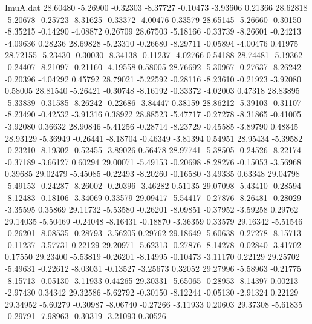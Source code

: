 \begin{filecontents}{ImuA.dat}
  28.60480   -5.26900   -0.32303   -8.37727   -0.10473   -3.93606    0.21366
  28.62818   -5.20678   -0.25723   -8.31625   -0.33372   -4.00476    0.33579
  28.65145   -5.26660   -0.30150   -8.35215   -0.14290   -4.08872    0.26709
  28.67503   -5.18166   -0.33739   -8.26601   -0.24213   -4.09636    0.28236
  28.69828   -5.23310   -0.26680   -8.29711   -0.05894   -4.00476    0.41975
  28.72155   -5.23430   -0.30030   -8.34138   -0.11237   -4.02766    0.54188
  28.74481   -5.19362   -0.24407   -8.21097   -0.21160   -4.19558    0.58005
  28.76692   -5.30967   -0.27637   -8.26242   -0.20396   -4.04292    0.45792
  28.79021   -5.22592   -0.28116   -8.23610   -0.21923   -3.92080    0.58005
  28.81540   -5.26421   -0.30748   -8.16192   -0.33372   -4.02003    0.47318
  28.83895   -5.33839   -0.31585   -8.26242   -0.22686   -3.84447    0.38159
  28.86212   -5.39103   -0.31107   -8.23490   -0.42532   -3.91316    0.38922
  28.88523   -5.47717   -0.27278   -8.31865   -0.41005   -3.92080    0.36632
  28.90846   -5.41256   -0.28714   -8.23729   -0.45585   -3.89790    0.48845
  28.93129   -5.36949   -0.26441   -8.18704   -0.46349   -3.81394    0.54951
  28.95434   -5.39582   -0.23210   -8.19302   -0.52455   -3.89026    0.56478
  28.97741   -5.38505   -0.24526   -8.22174   -0.37189   -3.66127    0.60294
  29.00071   -5.49153   -0.20698   -8.28276   -0.15053   -3.56968    0.39685
  29.02479   -5.45085   -0.22493   -8.20260   -0.16580   -3.49335    0.63348
  29.04798   -5.49153   -0.24287   -8.26002   -0.20396   -3.46282    0.51135
  29.07098   -5.43410   -0.28594   -8.12483   -0.18106   -3.34069    0.33579
  29.09417   -5.54417   -0.27876   -8.26481   -0.28029   -3.35595    0.35869
  29.11732   -5.53580   -0.26201   -8.09851   -0.37952   -3.59258    0.29762
  29.14035   -5.50469   -0.24048   -8.16431   -0.18870   -3.36359    0.33579
  29.16342   -5.51546   -0.26201   -8.08535   -0.28793   -3.56205    0.29762
  29.18649   -5.60638   -0.27278   -8.15713   -0.11237   -3.57731    0.22129
  29.20971   -5.62313   -0.27876   -8.14278   -0.02840   -3.41702    0.17550
  29.23400   -5.53819   -0.26201   -8.14995   -0.10473   -3.11170    0.22129
  29.25702   -5.49631   -0.22612   -8.03031   -0.13527   -3.25673    0.32052
  29.27996   -5.58963   -0.21775   -8.15713   -0.05130   -3.11933    0.44265
  29.30331   -5.65065   -0.28953   -8.14397    0.00213   -2.97430    0.34342
  29.32586   -5.62792   -0.30150   -8.12244   -0.05130   -2.91324    0.22129
  29.34952   -5.60279   -0.30987   -8.06740   -0.27266   -3.11933    0.20603
  29.37308   -5.61835   -0.29791   -7.98963   -0.30319   -3.21093    0.30526

\end{filecontents}
